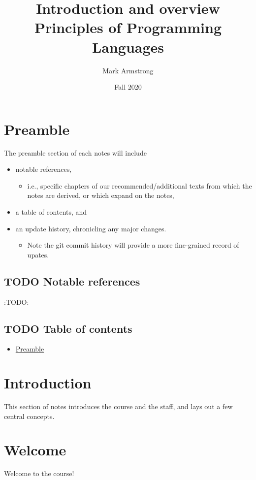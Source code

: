 \documentclass[11pt]{article}
\author{Mark Armstrong}
\date{Fall 2020}
\title{Introduction and overview\\\medskip
\large Principles of Programming Languages}
\theoremstyle{definition}
\begin{document}
\maketitle

\section{Preamble}
\label{sec:org32b6f5f}
The preamble section of each notes will include
\begin{itemize}
\item notable references,
\begin{itemize}
\item i.e., specific chapters of our recommended/additional texts
from which the notes are derived, or which expand on the notes,
\end{itemize}
\item a table of contents, and
\item an update history, chronicling any major changes.
\begin{itemize}
\item Note the git commit history will provide a more fine-grained
record of upates.
\end{itemize}
\end{itemize}

\subsection{{\bfseries\sffamily TODO} Notable references}
\label{sec:org583a82b}
:TODO:

\subsection{{\bfseries\sffamily TODO} Table of contents}
\label{sec:orgc96bb03}
\begin{scriptsize}
\begin{itemize}
\item \hyperref[sec:org32b6f5f]{Preamble}
\end{itemize}
\end{scriptsize}

\section{Introduction}
\label{sec:orge59eff7}
This section of notes introduces the course and the staff,
and lays out a few central concepts.

\section{Welcome}
\label{sec:org4eab0a7}
\begin{center}
Welcome to the course!
\end{center}
\end{document}

